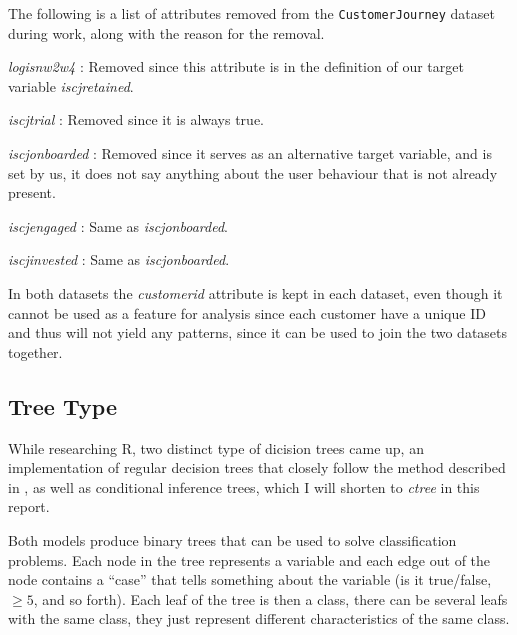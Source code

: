 \noindent The following is a list of attributes removed from the \texttt{CustomerJourney}
dataset during work, along with the reason for the removal.

\begin{itemize*}

	\item \textit{logisnw2w4} : Removed since this attribute is in the definition
	      of our target variable \textit{iscjretained}.

	\item \textit{iscjtrial} : Removed since it is always true.

	\item \textit{iscjonboarded} : Removed since it serves as an alternative
	      target variable, and is set by us, it does not say anything about the
	      user behaviour that is not already present.

	\item \textit{iscjengaged} : Same as \textit{iscjonboarded}.

	\item \textit{iscjinvested} : Same as \textit{iscjonboarded}.
\end{itemize*}

In both datasets the \textit{customerid} attribute is kept in each dataset, even
though it cannot be used as a feature for analysis since each customer have a
unique ID and thus will not yield any patterns, since it can be used to join the
two datasets together.


\subsection{Tree Type}

While researching R, two distinct type of dicision trees came up, an
implementation of regular decision trees that closely follow the method
described in \cite{breiman1}, as well as conditional inference
trees\cite{hothorn2006unbiased}, which I will shorten to \textit{ctree} in this
report.

Both models produce binary trees that can be used to solve classification
problems. Each node in the tree represents a variable and each edge out of the
node contains a ``case'' that tells something about the variable (is it
true/false, $\geq 5$, and so forth). Each leaf of the tree is then a class,
there can be several leafs with the same class, they just represent different
characteristics of the same class.

